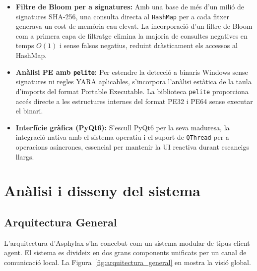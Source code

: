 \documentclass[12pt,a4paper]{report}
\begin{document}
\begin{itemize}
    \item \textbf{Filtre de Bloom per a signatures:} Amb una base de més d'un milió de signatures SHA-256, una consulta directa al \texttt{HashMap} per a cada fitxer generava un cost de memòria cau elevat. La incorporació d'un filtre de Bloom com a primera capa de filtratge elimina la majoria de consultes negatives en temps $O(1)$ i sense falsos negatius, reduint dràsticament els accessos al HashMap.
    \item \textbf{Anàlisi PE amb \texttt{pelite}:} Per estendre la detecció a binaris Windows sense signatures ni regles YARA aplicables, s'incorpora l'anàlisi estàtica de la taula d'imports del format Portable Executable. La biblioteca \texttt{pelite} proporciona accés directe a les estructures internes del format PE32 i PE64 sense executar el binari.
    \item \textbf{Interfície gràfica (PyQt6):} S'escull PyQt6 per la seva maduresa, la integració nativa amb el sistema operatiu i el suport de \texttt{QThread} per a operacions asíncrones, essencial per mantenir la UI reactiva durant escaneigs llargs.
\end{itemize}


\chapter{Anàlisi i disseny del sistema}
\label{ch:analisidisseny}

\section{Arquitectura General}
L'arquitectura d'Asphylax s'ha concebut com un sistema modular de tipus client-agent. El sistema es divideix en dos grans components unificats per un canal de comunicació local. La Figura~\ref{fig:arquitectura_general} en mostra la visió global.
\end{document}

